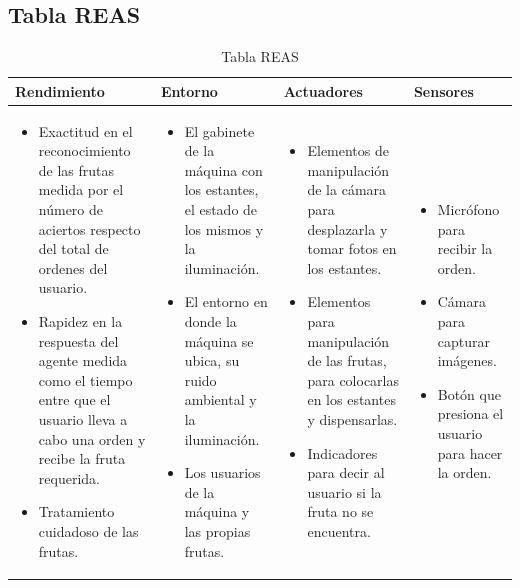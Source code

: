 \documentclass[a4paper, 12pt]{article}
\begin{document}
\subsection{Tabla REAS}
\begin{table}[htbp]
    \centering
    \begin{tabular}{|p{3.5cm}|p{3.5cm}|p{3.5cm}|p{3.5cm}|}
        \hline
        \textbf{Rendimiento} & \textbf{Entorno} & \textbf{Actuadores} & \textbf{Sensores} \\
        \hline
        \begin{itemize}[left=0pt, itemsep=-2pt]
            \item Exactitud en el reconocimiento de las frutas medida por el número de aciertos respecto del total de ordenes del usuario.
            \item Rapidez en la respuesta del agente medida como el tiempo entre que el usuario lleva a cabo una orden y recibe la fruta requerida.
            \item Tratamiento cuidadoso de las frutas.
        \end{itemize} & 
        \begin{itemize}[left=0pt, itemsep=-2pt]
            \item El gabinete de la máquina con los estantes, el estado de los mismos y la iluminación.
            \item El entorno en donde la máquina se ubica, su ruido ambiental y la iluminación.
            \item Los usuarios de la máquina y las propias frutas.
        \end{itemize} & 
        \begin{itemize}[left=0pt, itemsep=-2pt]
            \item Elementos de manipulación de la cámara para desplazarla y tomar fotos en los estantes.
            \item Elementos para manipulación de las frutas, para colocarlas en los estantes y dispensarlas.
            \item Indicadores para decir al usuario si la fruta no se encuentra.
        \end{itemize} & 
        \begin{itemize}[left=0pt]
            \item Micrófono para recibir la orden.
            \item Cámara para capturar imágenes.
            \item Botón que presiona el usuario para hacer la orden.
        \end{itemize} \\
        \hline
    \end{tabular}
    \caption{Tabla REAS}
    \label{tabla:ejemplo}
\end{table}
\end{document}
